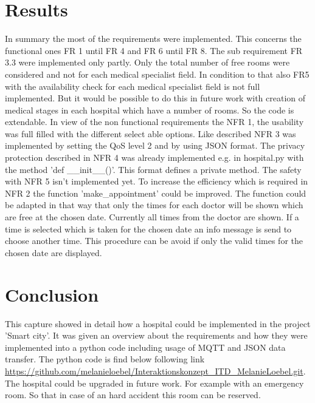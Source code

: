 \section{Results}
\label{sec:5}
In summary the most of the requirements were implemented. This concerns the functional ones FR 1 until FR 4 and FR 6 until FR 8. The sub requirement FR 3.3 were implemented only partly. Only the total number of free rooms were considered and not for each medical specialist field. In condition to that also FR5 with the availability check for each medical specialist field is not full implemented.  But it would be possible to do this in future work with creation of medical stages in each hospital which have a number of rooms. So the code is extendable. In view of the non functional requirements the NFR 1, the usability was full filled with the different select able options. Like described NFR 3 was implemented by setting the QoS level 2 and by using JSON format. The privacy protection described in NFR 4 was already implemented e.g. in hospital.py with the method 'def __init__()'. This format defines a private method. The safety with NFR 5 isn't implemented yet. To increase the efficiency which is required in NFR 2 the function 'make_appointment' could be improved. The function could be adapted in that way that only the times for each doctor will be shown which are free at the chosen date. Currently all times from the doctor are shown. If a time is selected which is taken for the chosen date an info message is send to choose another time. This procedure can be avoid if only the valid times for the chosen date are displayed.
\\

\section{Conclusion}
\label{sec:5}
This capture showed in detail how a hospital could be implemented in the project 'Smart city'. It was given an overview about the requirements and how they were implemented into a python code including usage of MQTT and JSON data transfer. The python code is find below following link \url{https://github.com/melanieloebel/Interaktionskonzept_ITD_MelanieLoebel.git}. The hospital could be upgraded in future work. For example with an emergency room. So that in case of an hard accident this room can be reserved.

\newpage

